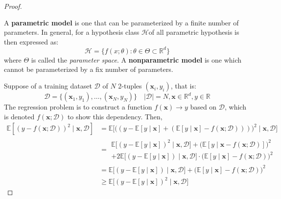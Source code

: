 \documentclass[10pt]{article} %
\begin{document}
\begin{proof}
    \begin{definition}[Parameterization]
        A \textbf{parametric model} is one that can be parameterized by a finite number of parameters. In general, for a hypothesis class $\mathcal{H}$of all parametric hypothesis is then expressed as:
        \begin{equation}
            \mathcal{H} = \{f(x;\theta): \theta \in \Theta \subset \mathbb{R}^{d}\}
        \end{equation} where $\Theta$ is called the \textit{parameter space}. A \textbf{nonparametric model} is one which cannot be parameterized by a fix number of parameters.   
    \end{definition}
    Suppose of a training dataset $\mathcal{D}$ of $N$ 2-tuples $(\mathbf{x}_{i},y_{i})$, that is: \begin{equation}
        \mathcal{D} = \{(\mathbf{x}_{1},y_{1}),\dots,(\mathbf{x}_{N},y_{N})\} \quad \lvert \mathcal{D} \rvert = N, \mathbf{x}\in \mathbb{R}^{d}, y \in \mathbb{R}
    \end{equation}
    The regression problem is to construct a function $f(\mathbf{x})\to y$ based on $\mathcal{D}$, which is denoted $f(\mathbf{x};\mathcal{D})$ to show this dependency. Then, 
    \begin{equation}
        \begin{split}
            \mathbb{E}\left[ (y-f(\mathbf{x};\mathcal{D}))^{2}\mid \mathbf{x},\mathcal{D}\right] & = \mathbb{E}\Big[\big( (y-\mathbb{E}[y\mid \mathbf{x}]+ (\mathbb{E}[y\mid \mathbf{x}]-f(\mathbf{x};\mathcal{D}))) \big)^{2}\mid \mathbf{x},\mathcal{D}\Big]\\
            & = \begin{multlined}
                \mathbb{E} \Big[ (y- \mathbb{E}[y\mid \mathbf{x}])^{2}\mid \mathbf{x},\mathcal{D} \Big] + \Big(\mathbb{E}[y\mid \mathbf{x}-f(\mathbf{x};\mathcal{D})]\Big)^{2} \\ + 2\mathbb{E} \big[(y-\mathbb{E}[y\mid \mathbf{x}])\mid \mathbf{x},\mathcal{D}\big]\cdot \big(\mathbb{E}[y\mid \mathbf{x}]-f(\mathbf{x;\mathcal{D}})\big)^{2} 
            \end{multlined} \\
            & = \mathbb{E} \Big[(y-\mathbb{E}[y\mid \mathbf{x}])\mid \mathbf{x},\mathcal{D}\Big] + \big(\mathbb{E}[y\mid \mathbf{x}]-f(\mathbf{x};\mathcal{D})\big)^{2}\\
            & \geq \mathbb{E} \big[(y-\mathbb{E}[y\mid \mathbf{x}])^{2}\mid \mathbf{x},\mathcal{D}\big]
        \end{split}

\end{equation}
\end{proof}
\end{document}
